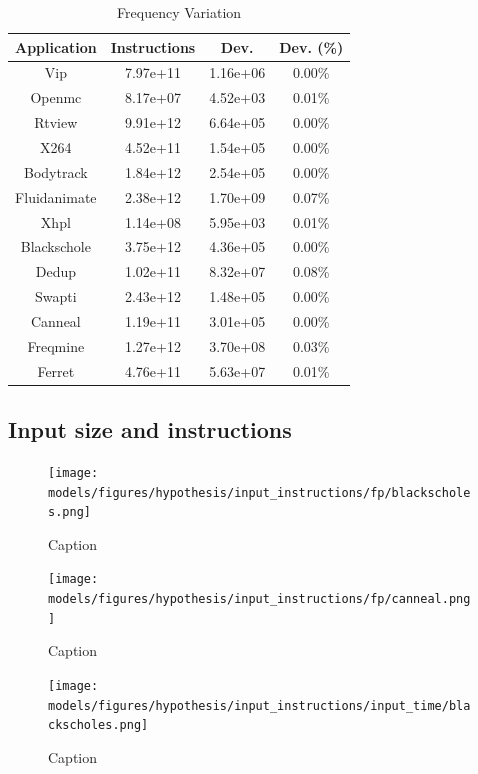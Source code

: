 \begin{table}[H]
	\caption{Frequency Variation}
	\begin{tabular}{|c|c|c|c|}
		\hline
		Application  & Instructions & Dev.     & Dev. (\%) \\ \hline
		Vip          & 7.97e+11     & 1.16e+06 & 0.00\%    \\ \hline
		Openmc       & 8.17e+07     & 4.52e+03 & 0.01\%    \\ \hline
		Rtview       & 9.91e+12     & 6.64e+05 & 0.00\%    \\ \hline
		X264         & 4.52e+11     & 1.54e+05 & 0.00\%    \\ \hline
		Bodytrack    & 1.84e+12     & 2.54e+05 & 0.00\%    \\ \hline
		Fluidanimate & 2.38e+12     & 1.70e+09 & 0.07\%    \\ \hline
		Xhpl         & 1.14e+08     & 5.95e+03 & 0.01\%    \\ \hline
		Blackschole  & 3.75e+12     & 4.36e+05 & 0.00\%    \\ \hline
		Dedup        & 1.02e+11     & 8.32e+07 & 0.08\%    \\ \hline
		Swapti       & 2.43e+12     & 1.48e+05 & 0.00\%    \\ \hline
		Canneal      & 1.19e+11     & 3.01e+05 & 0.00\%    \\ \hline
		Freqmine     & 1.27e+12     & 3.70e+08 & 0.03\%    \\ \hline
		Ferret       & 4.76e+11     & 5.63e+07 & 0.01\%    \\ \hline
	\end{tabular}
\end{table}

\subsection{Input size and instructions}

\begin{figure}[H]
	\centering
	\texttt{[image: models/figures/hypothesis/input\_instructions/fp/blackscholes.png]}
	\caption{Caption}
	\label{fig:my_label}
\end{figure}

\begin{figure}[H]
	\centering
	\texttt{[image: models/figures/hypothesis/input\_instructions/fp/canneal.png]}
	\caption{Caption}
	\label{fig:my_label}
\end{figure}

\begin{figure}[H]
	\centering
	\texttt{[image: models/figures/hypothesis/input\_instructions/input\_time/blackscholes.png]}
	\caption{Caption}
	\label{fig:my_label}
\end{figure}

